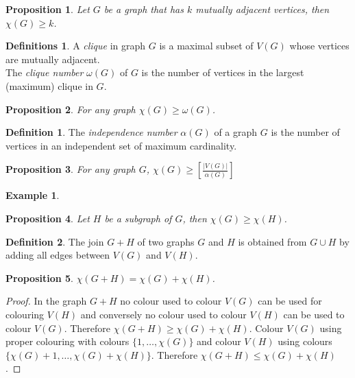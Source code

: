 \documentclass{article}
\newtheorem*{prop}{Proposition}
\theoremstyle{definition}
\newtheorem*{defn}{Definition}
\newtheorem*{defns}{Definitions}
\newtheorem*{ex}{Example}
\begin{document}
\begin{prop}
Let $G$ be a graph that has $k$ mutually adjacent vertices, then $\chi(G) \ge k$.
\end{prop}

\begin{defns}
A \emph{clique} in graph $G$ is a maximal subset of $V(G)$ whose vertices are mutually adjacent. \\
The \emph{clique number} $\omega(G)$ of $G$ is the number of vertices in the largest (maximum) clique in $G$.
\end{defns}

\begin{prop}
For any graph $\chi(G) \ge \omega(G)$.
\end{prop}

\begin{defn}
The \emph{independence number} $\alpha(G)$ of a graph $G$ is the number of vertices in an independent set of maximum cardinality.
\end{defn}

\begin{prop}
For any graph $G$, $\chi(G) \ge \left[ \frac{|V(G)|}{\alpha(G)}\right]$
\end{prop}

\begin{ex}
\end{ex}

\begin{prop}
Let $H$ be a subgraph of $G$, then $\chi(G) \ge \chi(H)$.
\end{prop}

\begin{defn}
The join $G+H$ of two graphs $G$ and $H$ is obtained from $G\cup H$ by adding all edges between $V(G)$ and $V(H)$.
\end{defn}

\begin{prop}
$\chi(G+H) = \chi(G) + \chi(H)$.
\end{prop}

\begin{proof}
In the graph $G+H$ no colour used to colour $V(G)$ can be used for colouring $V(H)$ and conversely no colour used to colour $V(H)$ can be used to colour $V(G)$.
Therefore $\chi(G+H) \ge \chi(G) + \chi(H)$.
Colour $V(G)$ using proper colouring with colours $\{1,\ldots,\chi(G)\}$ and colour $V(H)$ using colours $\{\chi(G) + 1,\ldots, \chi(G) + \chi(H)\}$.
Therefore $\chi(G+H) \le \chi(G)  + \chi(H) $.
\end{proof}
\end{document}
